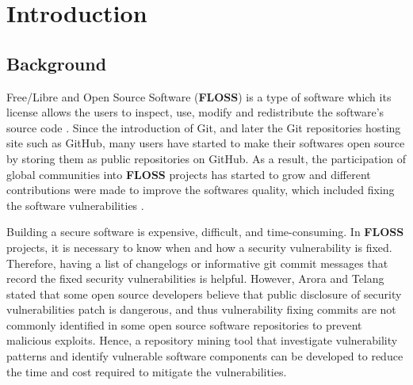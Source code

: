 \documentclass[12pt, a4paper]{report}
\begin{document}




\tableofcontents



\newpage


\chapter{Introduction}
\section{Background}
Free/Libre and Open Source Software (\textbf{FLOSS}) is a type of software which its license allows
the users to inspect, use, modify and redistribute the software's source code \cite{crowston_2012}.
Since the introduction of Git, and later the Git repositories hosting site such as GitHub, many
users have started to make their softwares open source by storing them as public repositories on
GitHub. As a result, the participation of global communities into \textbf{FLOSS} projects has
started to grow and different contributions were made to improve the softwares quality, which
included fixing the software vulnerabilities \cite{dabbish_2012}.

Building a secure software is expensive, difficult, and time-consuming. In \textbf{FLOSS} projects,
it is necessary to know when and how a security vulnerability is fixed. Therefore, having a list of
changelogs or informative git commit messages that record the fixed security vulnerabilities is
helpful. However, Arora and Telang \cite{arora_2005} stated that some open source developers believe
that public disclosure of security vulnerabilities patch is dangerous, and thus vulnerability fixing
commits are not commonly identified in some open source software repositories to prevent malicious
exploits. Hence, a repository mining tool that investigate vulnerability patterns and
identify vulnerable software components can be developed to reduce the time and cost required to
mitigate the vulnerabilities.
\end{document}
